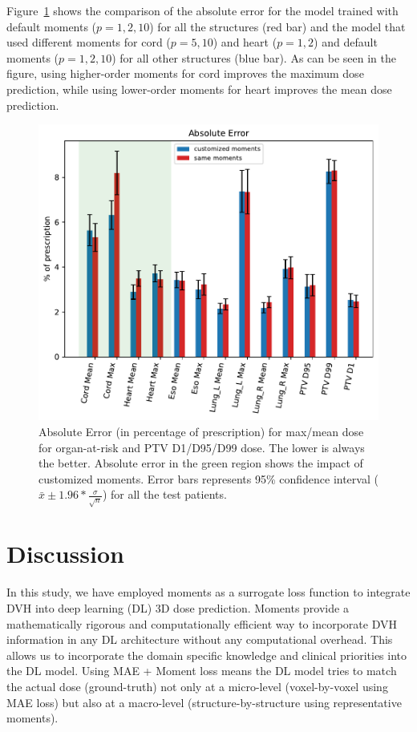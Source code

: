 \documentclass[10pt]{article}
\begin{document}
Figure~\ref{fig:SensitivityAnalysis1} shows the comparison of the absolute error for the model trained with default moments ($p=1,2,10$) for all the structures (red bar) and the model that used different moments for cord ($p=5,10$) and heart ($p=1,2$) and default moments ($p=1,2,10$) for all other structures (blue bar). As can be seen in the figure, using higher-order moments for cord improves the maximum dose prediction, while using lower-order moments for heart improves the mean dose prediction. 

\begin{figure}[htb!]
    \centering
    \includegraphics[width=0.95\linewidth]{DifferentMomentsDev.pdf}%
    \caption{Absolute Error (in percentage of prescription) for max/mean dose for organ-at-risk and PTV D1/D95/D99 dose. The lower is always the better. Absolute error in the green region shows the impact of customized moments. Error bars represents 95\% confidence interval ($\bar{x} \pm 1.96*\frac{\sigma}{\sqrt{n}}$) for all the test patients.}
    \label{fig:SensitivityAnalysis1}
\end{figure}

\section{Discussion}
In this study, we have employed moments as a surrogate loss function to integrate DVH into deep learning (DL) 3D dose prediction. Moments provide a mathematically rigorous and computationally efficient way to incorporate DVH information in any DL architecture without any computational overhead. This allows us to incorporate the domain specific knowledge and clinical priorities into the DL model. Using MAE + Moment loss means the DL model tries to match the actual dose (ground-truth) not only at a micro-level (voxel-by-voxel using MAE loss) but also at a macro-level (structure-by-structure using representative moments).
\end{document}
